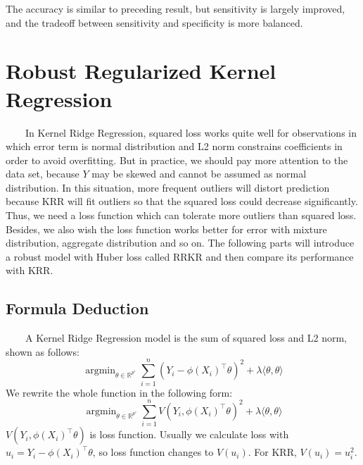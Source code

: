 \documentclass[11pt, oneside]{article}   	%
\begin{document}
The accuracy is similar to preceding result, but sensitivity is largely improved, and the tradeoff between sensitivity and specificity is more balanced.


\section{Robust Regularized Kernel Regression}
~~~~In Kernel Ridge Regression, squared loss works quite well for observations in which error term is normal distribution and L2 norm constrains coefficients in order to avoid overfitting.  But in practice, we should pay more attention to the data set, because $Y$ may be skewed and cannot be assumed as normal distribution.  In this situation, more frequent outliers will distort prediction because KRR will fit outliers so that the squared loss could decrease significantly.  Thus, we need a loss function which can tolerate more outliers than squared loss.  Besides, we also wish the loss function works better for error with mixture distribution, aggregate distribution and so on.  The following parts will introduce a robust model with Huber loss called RRKR and then compare its performance with KRR.

\subsection{Formula Deduction}
~~~~A Kernel Ridge Regression model is the sum of squared loss and L2 norm, shown as follows:
\begin{equation}
\mathop{argmin}_{\theta \in \mathbb{R}^{p'}} \sum_{i=1}^{n}(Y_i - \phi(X_i)^{\top}\theta)^2 + \lambda\langle\theta,\theta\rangle
\end{equation}
We rewrite the whole function in the following form:
\begin{equation}
\mathop{argmin}_{\theta \in \mathbb{R}^{p'}}\sum_{i=1}^{n} V(Y_i, \phi(X_i)^{\top}\theta)^2 + \lambda\langle\theta,\theta\rangle
\end{equation}
$V(Y_i, \phi(X_i)^{\top}\theta)$ is loss function. Usually we calculate loss with $u_i =  Y_i - \phi(X_i)^{\top}\theta$, so loss function changes to $V(u_i)$. For KRR, $V(u_i) = u_i^2$. \\
\end{document}
